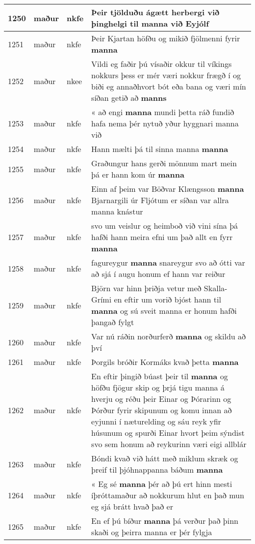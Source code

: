\documentclass{article}
\begin{document}
\begin{longtable}{p{1cm}|p{1cm}|p{1cm}|p{13cm}}
\hline
1250&maður&nkfe&Þeir tjölduðu ágætt herbergi við þinghelgi til \textbf{manna} við Eyjólf\\
\hline
1251&maður&nkfe&Þeir Kjartan höfðu og mikið fjölmenni fyrir \textbf{manna} \\
\hline
1252&maður&nkee&Vildi eg faðir þú vísaðir okkur til víkings nokkurs þess er mér væri nokkur frægð í og biði eg annaðhvort bót eða bana og væri mín síðan getið að \textbf{manns} \\
\hline
1253&maður&nkfe&« að engi \textbf{manna} mundi þetta ráð fundið hafa nema þér nytuð yður hyggnari manna við\\
\hline
1254&maður&nkfe&Hann mælti þá til sinna manna \textbf{manna} \\
\hline
1255&maður&nkfe&Graðungur hans gerði mönnum mart mein þá er hann kom úr \textbf{manna} \\
\hline
1256&maður&nkfe&Einn af þeim var Böðvar Klængsson \textbf{manna} Bjarnargili úr Fljótum er síðan var allra manna knástur\\
\hline
1257&maður&nkfe&svo um veislur og heimboð við vini sína þá hafði hann meira efni um það allt en fyrr \textbf{manna} \\
\hline
1258&maður&nkfe&fagureygur \textbf{manna} snareygur svo að ótti var að sjá í augu honum ef hann var reiður\\
\hline
1259&maður&nkfe&Björn var hinn þriðja vetur með Skalla-Grími en eftir um vorið bjóst hann til \textbf{manna} og sú sveit manna er honum hafði þangað fylgt\\
\hline
1260&maður&nkfe&Var nú ráðin norðurferð \textbf{manna} og skildu að því\\
\hline
1261&maður&nkfe&Þorgils bróðir Kormáks kvað þetta \textbf{manna} \\
\hline
1262&maður&nkfe&En eftir þingið búast þeir til \textbf{manna} og höfðu fjögur skip og þrjá tigu manna á hverju og réðu þeir Einar og Þórarinn og Þórður fyrir skipunum og komu innan að eyjunni í næturelding og sáu reyk yfir húsunum og spurði Einar hvort þeim sýndist svo sem honum að reykurinn væri eigi allblár\\
\hline
1263&maður&nkfe&Bóndi kvað við hátt með miklum skræk og þreif til þjóhnappanna báðum \textbf{manna} \\
\hline
1264&maður&nkfe&« Eg sé \textbf{manna} þér að þú ert hinn mesti íþróttamaður að nokkurum hlut en það mun eg sjá brátt hvað það er\\
\hline
1265&maður&nkfe&En ef þú bíður \textbf{manna} þá verður það þinn skaði og þeirra manna er þér fylgja\\

\end{longtable}
\end{document}
